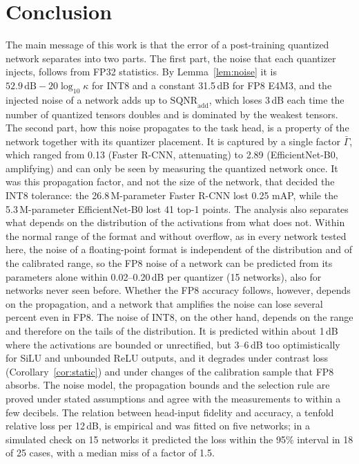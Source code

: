 \documentclass[pdflatex,sn-mathphys-num]{sn-jnl}%
\theoremstyle{thmstyleone}%
\theoremstyle{thmstyletwo}%
\theoremstyle{thmstylethree}%
\begin{document}
\section{Conclusion}\label{sec:conclusion}
The main message of this work is that the error of a post-training quantized network separates into two parts. The first part, the noise that each quantizer injects, follows from FP32 statistics. By Lemma~\ref{lem:noise} it is $52.9\,\mathrm{dB}-20\log_{10}\kappa$ for INT8 and a constant 31.5\,dB for FP8 E4M3, and the injected noise of a network adds up to $\mathrm{SQNR}_\text{add}$, which loses 3\,dB each time the number of quantized tensors doubles and is dominated by the weakest tensors. The second part, how this noise propagates to the task head, is a property of the network together with its quantizer placement. It is captured by a single factor $\bar\Gamma$, which ranged from 0.13 (Faster R-CNN, attenuating) to 2.89 (EfficientNet-B0, amplifying) and can only be seen by measuring the quantized network once. It was this propagation factor, and not the size of the network, that decided the INT8 tolerance: the 26.8\,M-parameter Faster R-CNN lost 0.25 mAP, while the 5.3\,M-parameter EfficientNet-B0 lost 41 top-1 points. The analysis also separates what depends on the distribution of the activations from what does not. Within the normal range of the format and without overflow, as in every network tested here, the noise of a floating-point format is independent of the distribution and of the calibrated range, so the FP8 noise of a network can be predicted from its parameters alone within 0.02--0.20\,dB per quantizer (15 networks), also for networks never seen before. Whether the FP8 accuracy follows, however, depends on the propagation, and a network that amplifies the noise can lose several percent even in FP8. The noise of INT8, on the other hand, depends on the range and therefore on the tails of the distribution. It is predicted within about 1\,dB where the activations are bounded or unrectified, but 3--6\,dB too optimistically for SiLU and unbounded ReLU outputs, and it degrades under contrast loss (Corollary~\ref{cor:static}) and under changes of the calibration sample that FP8 absorbs. The noise model, the propagation bounds and the selection rule are proved under stated assumptions and agree with the measurements to within a few decibels. The relation between head-input fidelity and accuracy, a tenfold relative loss per 12\,dB, is empirical and was fitted on five networks; in a simulated check on 15 networks it predicted the loss within the 95\% interval in 18 of 25 cases, with a median miss of a factor of 1.5.
\end{document}
